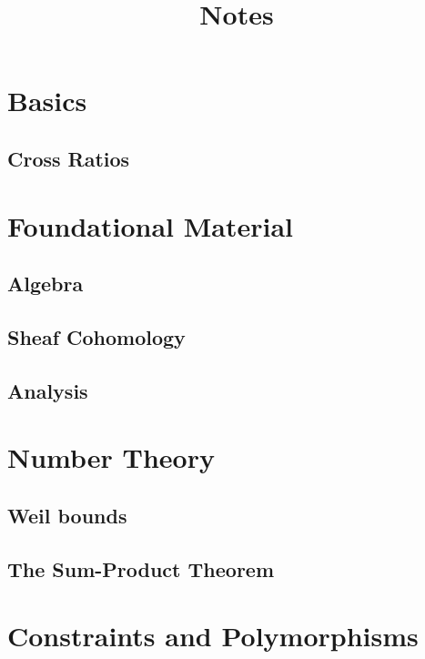 

\title{Notes}
\date{}
\author{}
\maketitle

\tableofcontents


\part{Basics}

\chapter{Cross Ratios}




\part{Foundational Material}

\chapter{Algebra}




\chapter{Sheaf Cohomology}




\chapter{Analysis}




\part{Number Theory}

\chapter{Weil bounds}




\chapter{The Sum-Product Theorem}




\part{Constraints and Polymorphisms}









